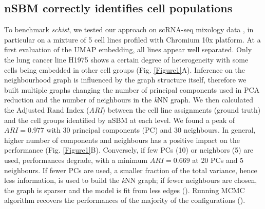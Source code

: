 \documentclass[10pt,letterpaper]{article}
\begin{document}



\subsection*{nSBM correctly identifies cell populations}
To benchmark \emph{schist}, we tested our approach on scRNA-seq mixology data \cite{tian_2019}, in particular on a mixture of 5 cell lines profiled with Chromium 10x platform. At a first evaluation of the UMAP embedding, all lines appear well separated. Only the lung cancer line H1975 shows a certain degree of heterogeneity with some cells being embedded in other cell groups (Fig. \ref{Figure1}A). Inference on the neighbourhood graph is influenced by the graph structure itself, therefore we built multiple graphs changing the number of principal components used in PCA reduction and the number of neighbours in the \emph{k}NN graph. We then calculated the Adjusted Rand Index (\emph{ARI}) between the cell line assignments (ground truth) and the cell groups identified by nSBM at each level. We found a peak of $ARI=0.977$ with 30 principal components (PC) and 30 neighbours. In general, higher number of components and neighbours has a positive impact on the performance (Fig. \ref{Figure1}B). Conversely, if few PCs (10) or neighbors (5) are used, performances degrade, with a minimum $ARI=0.669$ at 20 PCs and 5 neighbours. If fewer PCs are used, a smaller fraction of the total variance, hence less information, is used to build the \emph{k}NN graph; if fewer neighbours are chosen, the graph is sparser and the model is fit from less edges (). Running MCMC algorithm recovers the performances of the majority of the configurations ().
\end{document}
